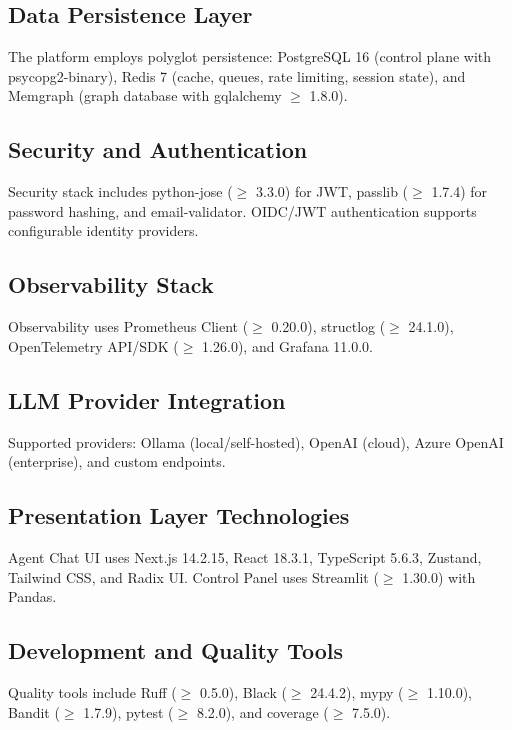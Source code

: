 \documentclass[a4paper,twoside]{sapthesis}
\begin{document}
\subsection{Data Persistence Layer}

The platform employs polyglot persistence: PostgreSQL 16 (control plane with psycopg2-binary), Redis 7 (cache, queues, rate limiting, session state), and Memgraph (graph database with gqlalchemy $\geq$ 1.8.0).

\subsection{Security and Authentication}

Security stack includes python-jose ($\geq$ 3.3.0) for JWT, passlib ($\geq$ 1.7.4) for password hashing, and email-validator. OIDC/JWT authentication supports configurable identity providers.

\subsection{Observability Stack}

Observability uses Prometheus Client ($\geq$ 0.20.0), structlog ($\geq$ 24.1.0), OpenTelemetry API/SDK ($\geq$ 1.26.0), and Grafana 11.0.0.

\subsection{LLM Provider Integration}

Supported providers: Ollama (local/self-hosted), OpenAI (cloud), Azure OpenAI (enterprise), and custom endpoints.

\subsection{Presentation Layer Technologies}

Agent Chat UI uses Next.js 14.2.15, React 18.3.1, TypeScript 5.6.3, Zustand, Tailwind CSS, and Radix UI. Control Panel uses Streamlit ($\geq$ 1.30.0) with Pandas.

\subsection{Development and Quality Tools}

Quality tools include Ruff ($\geq$ 0.5.0), Black ($\geq$ 24.4.2), mypy ($\geq$ 1.10.0), Bandit ($\geq$ 1.7.9), pytest ($\geq$ 8.2.0), and coverage ($\geq$ 7.5.0).
\end{document}

